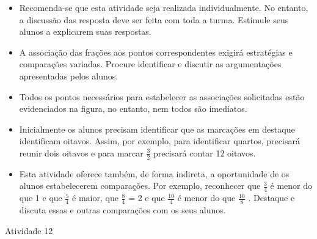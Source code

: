 \begin{multicols}{2}
\begin{itemize}  
     \item  Recomenda-se que esta atividade seja realizada individualmente. No entanto, a discussão das resposta deve ser feita com toda a turma. Estimule seus alunos a explicarem suas respostas.  
     \item  A associação das frações aos pontos correspondentes exigirá estratégias e comparações variadas. Procure identificar e discutir as argumentações apresentadas pelos alunos.   
     \item  Todos os pontos necessários para estabelecer as associações solicitadas estão evidenciados na figura, no entanto, nem todos são imediatos.  
     \item  Inicialmente os alunos precisam identificar que as marcações em destaque identificam oitavos. Assim, por exemplo, para identificar quartos, precisará reunir dois oitavos e para marcar   $\frac{3}{2}$   precisará contar 12 oitavos.  
     \item  Esta atividade oferece também, de forma indireta, a oportunidade de os alunos estabelecerem comparações. Por exemplo, reconhecer que   $\frac{3}{4}$   é menor do que 1 e que   $\frac{5}{4}$   é maior, que   $\frac{8}{4}$   = 2 e que   $\frac{10}{4}$   é menor do que   $\frac{10}{8}$  . Destaque e discuta essas e outras comparações com os seus alunos.   
\end{itemize}      
 
\begin{resposta*}{Atividade 12}
\noindent
{}
\end{resposta*}
\end{multicols}

